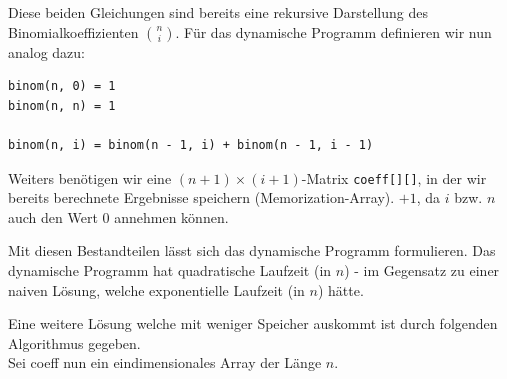 \documentclass{article}
\begin{document}
Diese beiden Gleichungen sind bereits eine rekursive Darstellung des
Binomialkoeffizienten $\binom{n}{i}$. F{\"u}r das dynamische Programm definieren 
wir nun analog dazu:

\begin{verbatim}
binom(n, 0) = 1
binom(n, n) = 1

binom(n, i) = binom(n - 1, i) + binom(n - 1, i - 1)
\end{verbatim}

Weiters ben{\"o}tigen wir eine $(n + 1)\times (i + 1)$-Matrix \texttt{coeff[][]},
in der wir bereits berechnete Ergebnisse speichern (Memorization-Array). $+ 1$,
da $i$ bzw. $n$ auch den Wert $0$ annehmen k{\"o}nnen.

Mit diesen Bestandteilen l{\"a}sst sich das dynamische Programm formulieren. Das
dynamische Programm hat quadratische Laufzeit (in $n$) - im Gegensatz zu einer
naiven L{\"o}sung, welche exponentielle Laufzeit (in $n$) h{\"a}tte.

\begin{minipage}{.315\textwidth}
\begin{algorithm}[H]
    \small
%
%
\end{algorithm}
\end{minipage}
\begin{minipage}{.635\textwidth}
\begin{algorithm}[H]
    \small
%
\end{algorithm}
\end{minipage}
\newpage
Eine weitere Lösung welche mit weniger Speicher auskommt ist durch folgenden Algorithmus gegeben.\\
Sei coeff nun ein eindimensionales Array der Länge $n$.\\
\end{document}

